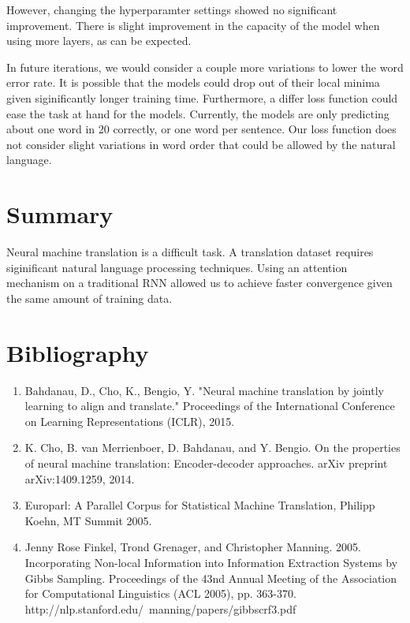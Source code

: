 \documentclass[letterpaper, 10pt]{article}
\begin{document}
\begin{multicols}{2}
\noindent However, changing the hyperparamter settings showed no significant improvement.
There is slight improvement in the capacity of the model when using more layers, as can be expected.

In future iterations, we would consider a couple more variations to lower the word error rate.
It is possible that the models could drop out of their local minima given siginificantly longer
training time.
Furthermore, a differ loss function could ease the task at hand for the models.
Currently, the models are only predicting about one word in 20 correctly, or one word per sentence.
Our loss function does not consider slight variations in word order that could be allowed by the
natural language.

\section{Summary}
Neural machine translation is a difficult task.
A translation dataset requires siginificant natural language processing techniques.
Using an attention mechanism on a traditional RNN allowed us to achieve faster convergence given
the same amount of training data.

\section{Bibliography}
\begin{enumerate}
\item Bahdanau, D., Cho, K., Bengio, Y. "Neural machine translation by jointly learning to align and translate." Proceedings of the International Conference on Learning Representations (ICLR), 2015.

\item K. Cho, B. van Merrienboer, D. Bahdanau, and Y. Bengio. On the properties of neural machine translation: Encoder-decoder approaches. arXiv preprint arXiv:1409.1259, 2014.

\item Europarl: A Parallel Corpus for Statistical Machine Translation, Philipp Koehn, MT Summit 2005.

\item Jenny Rose Finkel, Trond Grenager, and Christopher Manning. 2005. Incorporating Non-local Information into Information Extraction Systems by Gibbs Sampling. Proceedings of the 43nd Annual Meeting of the Association for Computational Linguistics (ACL 2005), pp. 363-370. http://nlp.stanford.edu/~manning/papers/gibbscrf3.pdf
\end{enumerate}

\end{multicols}
\end{document}
